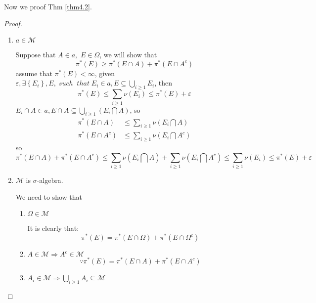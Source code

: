 Now we proof Thm \ref{thm4.2}.
\begin{proof}
	\text{}
	\begin{enumerate}
		\item $ a \in \mathcal{M} $
		
		Suppose that $ A \in a, $  $ E \in \Omega $, we will show that
		\begin{equation}
		{\pi ^*}\left( E \right) \geqslant {\pi ^*}\left( {E \cap A} \right) + {\pi ^*}\left( {E \cap {A^c}} \right)
		\label{eq4.19}
		\end{equation}
		assume that ${\pi ^*}\left( E \right) < \infty$, given $\varepsilon ,\exists \left\{ {{E_i}} \right\},E,\;such\;\;that\;{E_i} \in a,E \subseteq \bigcup\limits_{i \geqslant 1} {{E_i}} $, then
		\begin{equation}
		{\pi ^*}\left( E \right) \leqslant \sum\limits_{i \geqslant 1} {\nu \left( {{E_i}} \right)}  \leqslant {\pi ^*}\left( E \right) + \varepsilon 
		\label{eq4.20}
		\end{equation}
		${E_i} \cap A \in a,E \cap A \subseteq \bigcup\limits_{i \geqslant 1} {\left( {{E_i}\bigcap A } \right)} $, so
		\begin{equation}
		\begin{split}
		{\pi ^*}\left( {{E} \cap A} \right) & \leqslant \sum\limits_{i \geqslant 1} {\nu \left( {{E_i}\bigcap A } \right)} \\
		{\pi ^*}\left( {{E} \cap {A^c}} \right) & \leqslant \sum\limits_{i \geqslant 1} {\nu \left( {{E_i}\bigcap {{A^c}} } \right)} 
		\end{split}
		\label{eq4.21}
		\end{equation}
		so 
		\begin{equation}
		{\pi ^*}\left( {E \cap A} \right) + {\pi ^*}\left( {E \cap {A^c}} \right) \leqslant \sum\limits_{i \geqslant 1} {\nu \left( {{E_i}\bigcap A } \right)}  + \sum\limits_{i \geqslant 1} {\nu \left( {{E_i}\bigcap {{A^c}} } \right)} \le \sum\limits_{i \geqslant 1} {\nu \left( {{E_i}} \right)}  \leqslant \pi^{*}\left( E \right) + \varepsilon 
		\label{eq4.22}
		\end{equation}
		\item $ \mathcal{M} $ is $ \sigma $-algebra.
		
		We need to show that
		\begin{enumerate}
			\item $ \Omega \in \mathcal{M} $
			
			It is clearly that:
			\begin{equation}
			{\pi ^*}\left( E \right) = {\pi ^*}\left( {E \cap \Omega } \right) + {\pi ^*}\left( {E \cap {\Omega ^c}} \right)
			\label{eq4.23}
			\end{equation}
			\item $ A \in \mathcal{M} \Rightarrow A^{c} \in \mathcal{M} $
			\begin{equation}
			\because {\pi ^*}\left( E \right) = {\pi ^*}\left( {E \cap A} \right) + {\pi ^*}\left( {E \cap {A^c}} \right)
			\label{eq4.24}
			\end{equation}
			\item ${A_i} \in \mathcal{M} \Rightarrow \bigcup\limits_{i \geqslant 1} {{A_i}}  \subseteq \mathcal{M}$
			

\end{enumerate}
\end{enumerate}
\end{proof}

